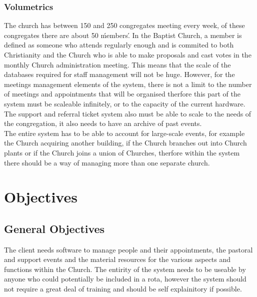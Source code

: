 \subsubsection{Volumetrics}
	The church has between 150 and 250 congregates meeting every week, of these congregates there are about 50 \'members\'. In the Baptist Church, a member is defined as someone who attends regularly enough and is commited to both Christianity and the Church who is able to make proposals and cast votes in the monthly Church administration meeting. This means that the scale of the databases required for staff management will not be huge. However, for the meetings management elements of the system, there is not a limit to the number of meetings and appointments that will be organised therfore this part of the system must be scaleable infinitely, or to the capacity of the current hardware. The support and referral ticket system also must be able to scale to the needs of the congregation, it also needs to have an archive of past events.
	\\
	The entire system has to be able to account for large-scale events, for example the Church acquiring another building, if the Church branches out into Church plants or if the Church joins a union of Churches, therfore within the system there should be a way of managing more than one separate church.


\section{Objectives}

\subsection{General Objectives}
	The client needs software to manage people and their appointments, the pastoral and support events and the material resources for the various aspects and functions within the Church. The entirity of the system needs to be useable by anyone who could potentially be included in a rota, however the system should not require a great deal of training and should be self explainitory if possible.

